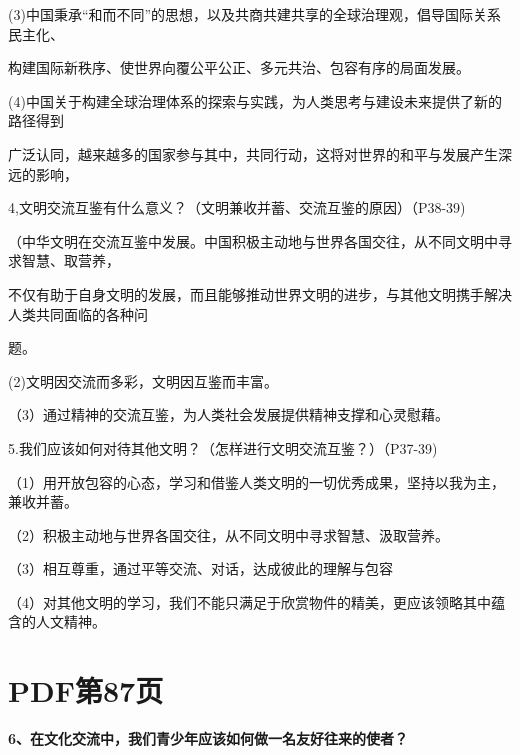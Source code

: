 \documentclass[lang=cn,11pt]{elegantbook}
\begin{document}
(3)中国秉承“和而不同”的思想，以及共商共建共享的全球治理观，倡导国际关系民主化、\par

构建国际新秩序、使世界向覆公平公正、多元共治、包容有序的局面发展。\par

(4)中国关于构建全球治理体系的探索与实践，为人类思考与建设未来提供了新的路径得到\par

广泛认同，越来越多的国家参与其中，共同行动，这将对世界的和平与发展产生深远的影响，\par

4,文明交流互鉴有什么意义？（文明兼收并蓄、交流互鉴的原因）（P38-39)\par

（中华文明在交流互鉴中发展。中国积极主动地与世界各国交往，从不同文明中寻求智慧、取营养，\par

不仅有助于自身文明的发展，而且能够推动世界文明的进步，与其他文明携手解决人类共同面临的各种问\par

题。\par

(2)文明因交流而多彩，文明因互鉴而丰富。\par

（3）通过精神的交流互鉴，为人类社会发展提供精神支撑和心灵慰藉。\par

5.我们应该如何对待其他文明？（怎样进行文明交流互鉴？）（P37-39)\par

（1）用开放包容的心态，学习和借鉴人类文明的一切优秀成果，坚持以我为主，兼收并蓄。\par

（2）积极主动地与世界各国交往，从不同文明中寻求智慧、汲取营养。\par

（3）相互尊重，通过平等交流、对话，达成彼此的理解与包容\par

（4）对其他文明的学习，我们不能只满足于欣赏物件的精美，更应该领略其中蕴含的人文精神。\par


\section*{PDF第87页}

\textbf{6、在文化交流中，我们青少年应该如何做一名友好往来的使者？}\par
\end{document}
